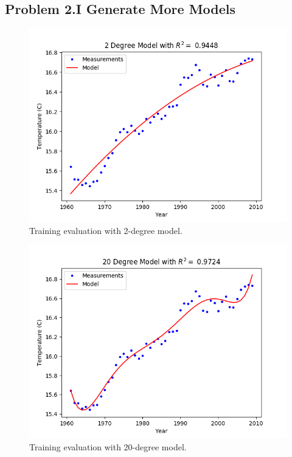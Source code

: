 \documentclass[letterpaper]{article}
\begin{document}
	\subsection*{Problem 2.I Generate More Models}
	\begin{figure}[h]
		\includegraphics[scale=0.625]{Figure_5_D2I_2degree}
		\centering
		\caption{Training evaluation with 2-degree model.}
		\label{fig:2 degree training}
	\end{figure}\begin{figure}[h]
		\includegraphics[scale=0.625]{Figure_6_D2I_20degree}
		\centering
		\caption{Training evaluation with 20-degree model.}
		\label{fig:20 degree training}
	\end{figure}
\end{document}
